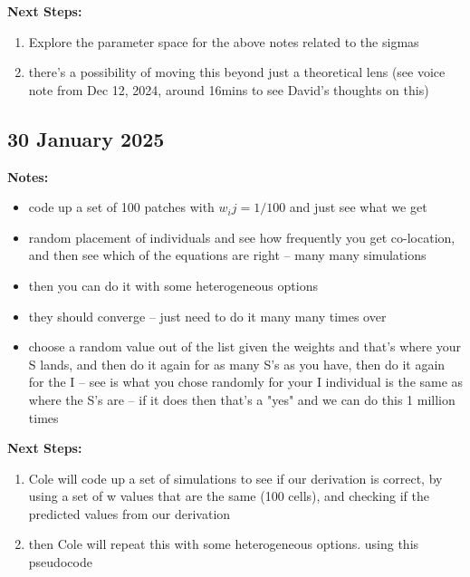 \documentclass[11pt]{article}
\begin{document}
\textbf{Next Steps:}
\begin{enumerate}
    \item Explore the parameter space for the above notes related to the sigmas 
    \item there's a possibility of moving this beyond just a theoretical lens (see voice note from Dec 12, 2024, around 16mins to see David's thoughts on this) 
\end{enumerate}


\subsection{30 January 2025}
\textbf{Notes:}
\begin{itemize}
    \item code up a set of 100 patches with $w_ij= 1/100$ and just see what we get 
    \item random placement of individuals and see how frequently you get co-location, and then see which of the equations are right -- many many simulations
    \item then you can do it with some heterogeneous options 
    \item they should converge -- just need to do it many many times over 
    \item choose a random value out of the list given the weights and that's where your S lands, and then do it again for as many S's as you have, then do it again for the I -- see is what you chose randomly for your I individual is the same as where the S's are -- if it does then that's a "yes" and we can do this 1 million times 
\end{itemize}
\textbf{Next Steps:}
\begin{enumerate}
    \item Cole will code up a set of simulations to see if our derivation is correct, by using a set of w values that are the same (100 cells), and checking if the predicted values from our derivation 
    \item then Cole will repeat this with some heterogeneous options. using this pseudocode 
\end{enumerate}
\end{document}
